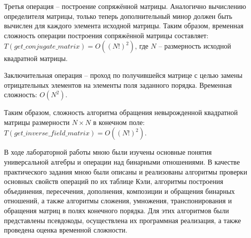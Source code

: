 \documentclass[spec, och, otchet, hidelinks]{SCWorks}
\begin{document}
\par Третья операция -- построение сопряжённой матрицы. Аналогично вычислению
определителя матрицы, только теперь дополнительный минор должен быть вычислен
для каждого элемента исходной матрицы. Таким образом, временная сложность
операции построения сопряжённой матрицы составляет: $T(get\_conjugate\_matrix) =
O((N!)^2)$, где $N$ -- размерность исходной квадратной матрицы.

\par Заключительная операция -- проход по получившейся матрице с целью
замены отрицательных элементов на элементы поля заданного порядка. Временная
сложность: $O(N^2)$.

\par Таким образом, сложность алгоритма обращения невырожденной квадратной
матрицы размерности $N \times N$ в конечном поле:
$T(get\_inverse\_field\_matrix) = O((N!)^2)$.

\newpage

\conclusion

\par В ходе лабораторной работы мною были изучены основные понятия универсальной
алгебры и операции над бинарными отношениями. В качестве практического задания
мною были описаны и реализованы алгоритмы проверки основных свойств операций по
их таблице Кэли, алгоритмы построения объединения, пересечения, дополнения,
композиции и обращения бинарных отношений, а также алгоритмы сложения,
умножения, транспонирования и обращения матриц в полях конечного порядка. Для
этих алгоритмов были представлены псевдокоды, осуществлена их программная
реализация, а также проведена оценка временной сложности.
\end{document}
